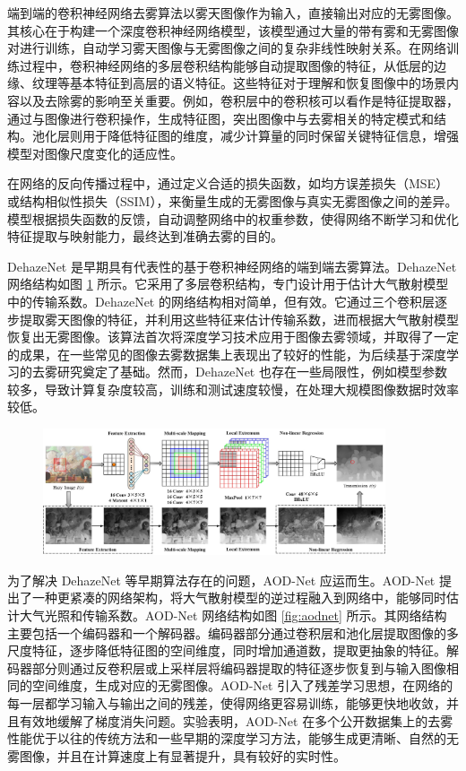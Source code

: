 端到端的卷积神经网络去雾算法以雾天图像作为输入，直接输出对应的无雾图像。其核心在于构建一个深度卷积神经网络模型，该模型通过大量的带有雾和无雾图像对进行训练，自动学习雾天图像与无雾图像之间的复杂非线性映射关系。在网络训练过程中，卷积神经网络的多层卷积结构能够自动提取图像的特征，从低层的边缘、纹理等基本特征到高层的语义特征。这些特征对于理解和恢复图像中的场景内容以及去除雾的影响至关重要。例如，卷积层中的卷积核可以看作是特征提取器，通过与图像进行卷积操作，生成特征图，突出图像中与去雾相关的特定模式和结构。池化层则用于降低特征图的维度，减少计算量的同时保留关键特征信息，增强模型对图像尺度变化的适应性。

在网络的反向传播过程中，通过定义合适的损失函数，如均方误差损失（MSE）或结构相似性损失（SSIM），来衡量生成的无雾图像与真实无雾图像之间的差异。模型根据损失函数的反馈，自动调整网络中的权重参数，使得网络不断学习和优化特征提取与映射能力，最终达到准确去雾的目的。

DehazeNet\cite{cai2016dehazenet} 是早期具有代表性的基于卷积神经网络的端到端去雾算法。DehazeNet 网络结构如图 \ref{fig:dehazenet} 所示。它采用了多层卷积结构，专门设计用于估计大气散射模型中的传输系数。DehazeNet 的网络结构相对简单，但有效。它通过三个卷积层逐步提取雾天图像的特征，并利用这些特征来估计传输系数，进而根据大气散射模型恢复出无雾图像。该算法首次将深度学习技术应用于图像去雾领域，并取得了一定的成果，在一些常见的图像去雾数据集上表现出了较好的性能，为后续基于深度学习的去雾研究奠定了基础。然而，DehazeNet 也存在一些局限性，例如模型参数较多，导致计算复杂度较高，训练和测试速度较慢，在处理大规模图像数据时效率较低。

\begin{figure}[htbp]
    \centering
    \includegraphics[width=0.9\textwidth]{../figure/hazenet.png}
    \captionsetup{font=footnotesize}
    \label{fig:dehazenet}
\end{figure}

为了解决 DehazeNet 等早期算法存在的问题，AOD-Net 应运而生。AOD-Net 提出了一种更紧凑的网络架构，将大气散射模型的逆过程融入到网络中，能够同时估计大气光照和传输系数。AOD-Net 网络结构如图 \ref{fig:aodnet} 所示。其网络结构主要包括一个编码器和一个解码器。编码器部分通过卷积层和池化层提取图像的多尺度特征，逐步降低特征图的空间维度，同时增加通道数，提取更抽象的特征。解码器部分则通过反卷积层或上采样层将编码器提取的特征逐步恢复到与输入图像相同的空间维度，生成对应的无雾图像。AOD-Net 引入了残差学习思想，在网络的每一层都学习输入与输出之间的残差，使得网络更容易训练，能够更快地收敛，并且有效地缓解了梯度消失问题。实验表明，AOD-Net 在多个公开数据集上的去雾性能优于以往的传统方法和一些早期的深度学习方法，能够生成更清晰、自然的无雾图像，并且在计算速度上有显著提升，具有较好的实时性。

